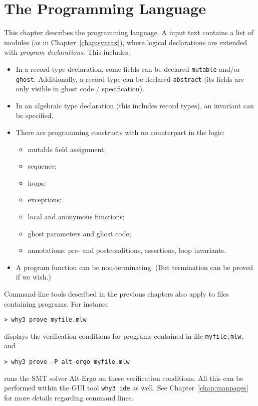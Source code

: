 \chapter{The \whyml Programming Language}
\label{chap:whyml}

This chapter describes the \whyml programming language.
A \whyml input text contains a list of modules (as in
Chapter~\ref{chap:syntax}), where logical declarations are extended
with \emph{program declarations}.
This includes:
\begin{itemize}
\item
  In a record type declaration, some fields can be declared
  \texttt{mutable} and/or \texttt{ghost}.
  Additionally, a record type can be declared \texttt{abstract} (its
  fields are only visible in ghost code / specification).
\item
  In an algebraic type declaration (this includes record types), an
  invariant can be specified.
\item
  There are programming constructs with no counterpart in the logic:
  \begin{itemize}
  \item mutable field assignment;
  \item sequence;
  \item loops;
  \item exceptions;
  \item local and anonymous functions;
  \item ghost parameters and ghost code;
  \item annotations: pre- and postconditions, assertions, loop invariants.
  \end{itemize}
\item
  A program function can be non-terminating. (But termination can be
  proved if we wish.)
\end{itemize}
%
Command-line tools described in the previous chapters also apply to
files containing programs. For instance
\begin{verbatim}
> why3 prove myfile.mlw
\end{verbatim}
displays the verification conditions for programs contained in
file \texttt{myfile.mlw}, and
\begin{verbatim}
> why3 prove -P alt-ergo myfile.mlw
\end{verbatim}
runs the SMT solver Alt-Ergo on these verification conditions.
All this can be performed within the GUI tool \texttt{why3 ide} as well.
See Chapter~\ref{chap:manpages} for more details regarding command lines.


